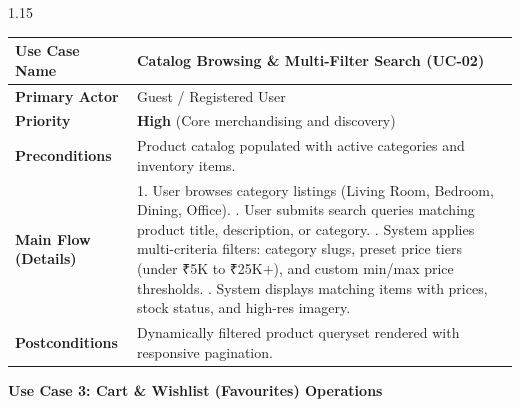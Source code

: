\documentclass[12pt,a4paper]{article}
\begin{document}
{\begin{spacing}{1.15}
\begin{center}
\renewcommand{\arraystretch}{1.2}
\fontsize{10.5}{14}\selectfont
\begin{tabular}{|p{1.6in}|p{4.9in}|}
\hline
\textbf{Use Case Name} & Catalog Browsing \& Multi-Filter Search (\textbf{UC-02}) \\ \hline
\textbf{Primary Actor} & Guest / Registered User \\ \hline
\textbf{Priority} & \textbf{High} (Core merchandising and discovery) \\ \hline
\textbf{Preconditions} & Product catalog populated with active categories and inventory items. \\ \hline
\textbf{Main Flow (Details)} &
1. User browses category listings (Living Room, Bedroom, Dining, Office). \newline
2. User submits search queries matching product title, description, or category. \newline
3. System applies multi-criteria filters: category slugs, preset price tiers (under ₹5K to ₹25K+), and custom min/max price thresholds. \newline
4. System displays matching items with prices, stock status, and high-res imagery. \\ \hline
\textbf{Postconditions} & Dynamically filtered product queryset rendered with responsive pagination. \\ \hline
\end{tabular}
\end{center}

\vspace{0.08in}

\noindent
\textbf{Use Case 3: Cart \& Wishlist (Favourites) Operations}

\vspace{0.04in}


\end{spacing}}
\end{document}
